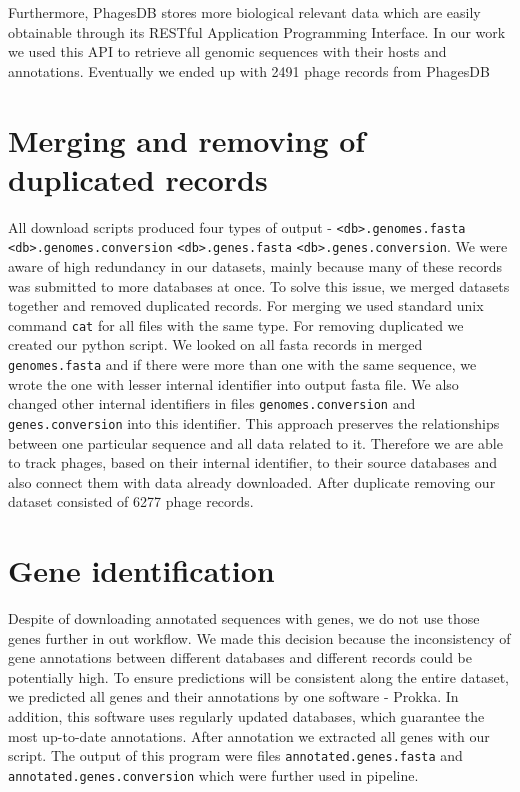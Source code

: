 Furthermore, PhagesDB stores more biological relevant data which are easily obtainable through its RESTful Application Programming Interface.
In our work we used this API to retrieve all genomic sequences with their hosts and annotations.
Eventually we ended up with 2491 phage records from PhagesDB 

\section{Merging and removing of duplicated records}
All download scripts produced four types of output - \verb|<db>.genomes.fasta| \verb|<db>.genomes.conversion| \verb|<db>.genes.fasta| \verb|<db>.genes.conversion|. 
We were aware of high redundancy in our datasets, mainly because many of these records was submitted to more databases at once.
To solve this issue, we merged datasets together and removed duplicated records.
For merging we used standard unix command \verb|cat| for all files with the same type.
For removing duplicated we created our python script.
We looked on all fasta records in merged \verb|genomes.fasta| and if there were more than one with the same sequence, we wrote the one with lesser internal identifier into output fasta file.
We also changed other internal identifiers in files \verb|genomes.conversion| and \verb|genes.conversion| into this identifier.
This approach preserves the relationships between one particular sequence and all data related to it.
Therefore we are able to track phages, based on their internal identifier, to their source databases and also connect them with data already downloaded.
After duplicate removing our dataset consisted of 6277 phage records.

\section{Gene identification}
Despite of downloading annotated sequences with genes, we do not use those genes further in out workflow.
We made this decision because the inconsistency of gene annotations between different databases and different records could be potentially high.
To ensure predictions will be consistent along the entire dataset, we predicted all genes and their annotations by one software - Prokka.
In addition, this software uses regularly updated databases, which guarantee the most up-to-date annotations.
After annotation we extracted all genes with our script.
The output of this program were files \verb|annotated.genes.fasta| and \verb|annotated.genes.conversion| which were further used in pipeline.

